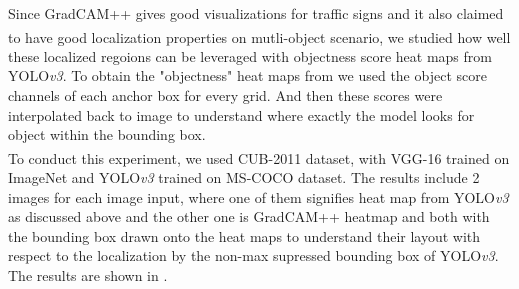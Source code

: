 \documentclass[letterpaper]{article}
\begin{document}
Since GradCAM++ gives good visualizations for traffic signs and it also claimed to have good localization properties\textsuperscript{\cite{Chattopadhay_2018}} on mutli-object scenario, we studied how well these localized regoions can be leveraged with objectness score heat maps from YOLO\emph{v3}. To obtain the "objectness" heat maps from we used the object score channels of each anchor box for every grid. And then these scores were interpolated back to image to understand where exactly the model looks for object within the bounding box.\\
To conduct this experiment, we used CUB-2011\textsuperscript{\cite{WahCUB_200_2011}} dataset, with VGG-16 trained on ImageNet and YOLO\emph{v3} trained on MS-COCO dataset. The results include 2 images for each image input, where one of them signifies heat map from YOLO\emph{v3} as discussed above and the other one is GradCAM++ heatmap and both with the bounding box drawn onto the heat maps to understand their layout with respect to the localization by the non-max supressed bounding box of YOLO\emph{v3}. The results are shown in .\\
\end{document}
